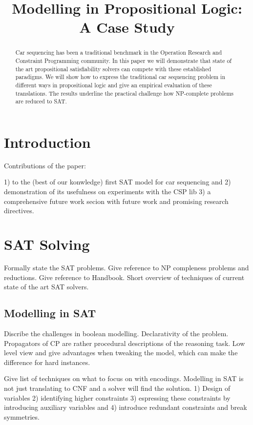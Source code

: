 \documentclass[]{llncs}
\title{Modelling in Propositional Logic: A Case Study}
\begin{document}
 

\maketitle

\begin{abstract}
    Car sequencing has been a traditional benchmark in the Operation Research and Constraint Programming community. In
    this paper we will demonstrate that state of the art propositional satisfiability solvers can compete with these
    established paradigms.  We will show how to express the traditional car sequencing problem in different ways in
    propositional logic and give an empirical evaluation of these translations. The results underline the practical
    challenge how NP-complete problems are reduced to SAT. 
\end{abstract}

\section{Introduction}

Contributions of the paper: 

1) to the (best of our konwledge) first SAT model for car sequencing and 2) demonstration of its usefulness on experiments
with the CSP lib 3) a comprehensive future work secion with future work and promising research directives. 

\section{SAT Solving}

Formally state the SAT problems. Give reference to NP compleness problems and reductions. Give reference to Handbook. 
Short overview of techniques of current state of the art SAT solvers. 

\subsection{Modelling in SAT}

Discribe the challenges in boolean modelling. Declarativity of the problem. Propagators of CP are rather procedural
descriptions of the reasoning task. Low level view and give advantages when tweaking the model, which can make the
difference for hard instances. 

Give list of techniques on what to focus on with encodings. Modelling in SAT is not just translating to CNF and a solver
will find the solution. 1) Design of variables 2) identifying higher constraints 3) espressing these constraints by
introducing auxiliary variables and 4) introduce redundant constraints and break symmetries. 
\end{document}

